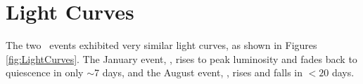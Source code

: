 \section{Light Curves}\label{sec:LightCurves}

The two \spock\ events exhibited very similar light curves, as shown
in Figures \ref{fig:LightCurves}.  The January event, \spockone, rises
to peak luminosity and fades back to quiescence in only $\sim$7 days,
and the August event, \spocktwo, rises and falls in $<20$ days.
  
  
  
